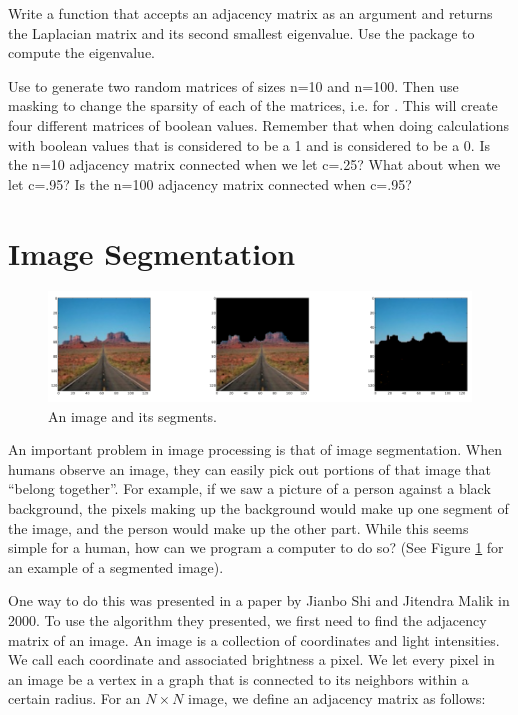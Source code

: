 \begin{problem}Write a function  that accepts an adjacency matrix as an argument and returns the Laplacian matrix and its second smallest eigenvalue.
Use the  package to compute the eigenvalue.

Use  to generate two random matrices of sizes n=10 and n=100.
Then use masking to change the sparsity of each of the matrices, i.e.  for . This will create four different matrices of boolean values. Remember that when doing calculations with boolean values that  is considered to be a 1 and  is considered to be a 0. Is the n=10 adjacency matrix connected when we let c=.25? What about when we let c=.95? Is the n=100 adjacency matrix connected when c=.95?
\end{problem}


\section*{Image Segmentation}

\begin{figure}
\centering
\includegraphics[width=\textwidth]{monuments.png}
\caption{An image and its segments.}
\label{fig:monument}
\end{figure}

An important problem in image processing is that of image segmentation.
When humans observe an image, they can easily pick out portions of that image that ``belong together''.
For example, if we saw a picture of a person against a black background, the pixels making up the background would make up one segment of the image, and the person would make up the other part.
While this seems simple for a human, how can we program a computer to do so? (See Figure \ref{fig:monument} for an example of a segmented image).

One way to do this was presented in a paper by Jianbo Shi and Jitendra Malik in 2000. To use the algorithm they presented, we first need to find the adjacency matrix of an image.
An image is a collection of coordinates and light intensities.
We call each coordinate and associated brightness a pixel.
We let every pixel in an image be a vertex in a graph that is connected to its neighbors within a certain radius.
For an $N \times N$ image, we define an adjacency matrix as follows:

